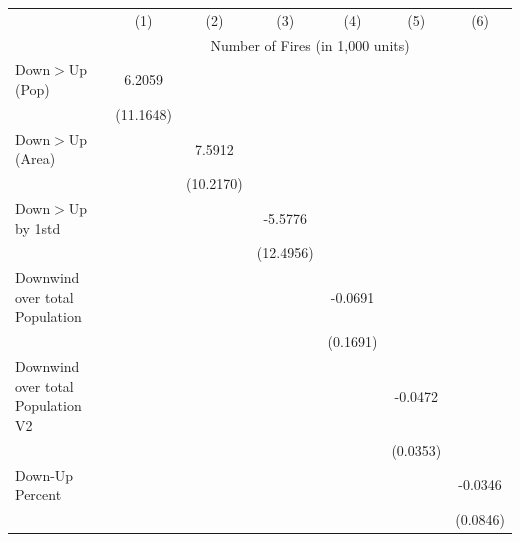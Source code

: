 \begin{tabular}{lcccccc}
\hline
& (1) & (2) & (3) & (4) & (5) & (6)\\
& \multicolumn{6}{c}{Number of Fires (in 1,000 units) }\\
\hline

Down$>$Up (Pop)&      6.2059         &                     &                     &                     &                     &                     \\
            &   (11.1648)         &                     &                     &                     &                     &                     \\
Down$>$Up (Area)&                     &      7.5912         &                     &                     &                     &                     \\
            &                     &   (10.2170)         &                     &                     &                     &                     \\
Down$>$Up by 1std&                     &                     &     -5.5776         &                     &                     &                     \\
            &                     &                     &   (12.4956)         &                     &                     &                     \\
Downwind over total Population&                     &                     &                     &     -0.0691         &                     &                     \\
            &                     &                     &                     &    (0.1691)         &                     &                     \\
Downwind over total Population V2&                     &                     &                     &                     &     -0.0472         &                     \\
            &                     &                     &                     &                     &    (0.0353)         &                     \\
Down-Up Percent&                     &                     &                     &                     &                     &     -0.0346         \\
            &                     &                     &                     &                     &                     &    (0.0846)         \\
\hline

\end{tabular}
